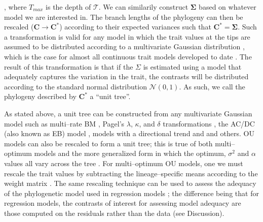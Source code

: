 \documentclass[a4paper,12pt]{article}
\begin{document}
\citep{Hansen1997, ButlerKing2004}, where $T_{max}$ is the depth of $\mathcal{T}$.
We can similarily construct $\mathbf{\Sigma}$ based on whatever model we are interested in. The branch lengths of the phylogeny can then be rescaled ($\mathbf{C} \rightarrow \mathbf{C}^*$) according to their expected variances such that $\mathbf{C}^*=\mathbf{\Sigma}$. Such a transformation is valid for any model in which the trait values at the tips are assumed to be distributed according to a multivariate Gaussian distribution \citep{HoAne2013}, which is the case for almost all continuous trait models developed to date \citep{Omeara2012}. The result of this transformation is that if the $\Sigma$ is estimated using a model that adequately captures the variation in the trait, the contrasts will be distributed according to the standard normal distribution $\mathcal{N}(0,1)$. As such, we call the phylogeny described by $\mathbf{C}^*$ a ``unit tree''.

As stated above, a unit tree can be constructed from any multivariate Gaussian model such as multi--rate BM \citep{Omeara2006, Thomas2006, Eastman2011, Revell2012}, Pagel's $\lambda$, $\kappa$, and $\delta$ transformations \citep{Pagel1997, Pagel1999}, the AC/DC (also known as EB) model \citep{Blomberg2003, Harmon2010}, models with a directional trend \citep{Hunt2007} and and others. OU models can also be rescaled to form a unit tree; this is true of both multi--optimum \citep{ButlerKing2004} models and the more generalized form \citep{Beaulieu2012} in which the optimum, $\sigma^2$ and $\alpha$ values all vary across the tree \citep{HoAne2013}. For multi--optimum OU models, one we must rescale the trait values by subtracting the lineage--specific means according to the weight matrix \citep[see][]{Hansen1997, ButlerKing2004, Beaulieu2012, UyedaBayou}. The same rescaling technique can be used to assess the adequacy of the phylogenetic model used in regression models \citep{Grafen1989, Rohlf2001}; the difference being that for regression models, the contrasts of interest for assessing model adequacy are those computed on the residuals rather than the data (see Discussion).
\end{document}
